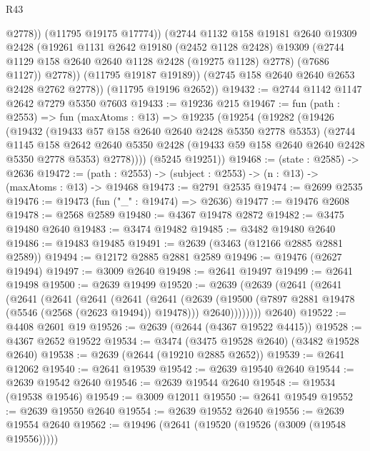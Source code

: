 \begin{lexlean}{R43}
\begin{coremodule}
                  @2778))
              (@11795 @19175 @17774))
            (@2744
              @1132
              @158
              @19181
              @2640
              @19309
              @2428
              (@19261
                @1131
                @2642
                @19180
                (@2452 @1128 @2428)
                @19309
                (@2744 @1129 @158 @2640 @2640 @1128 @2428 (@19275 @1128) @2778)
                (@7686 @1127))
              @2778))
          (@11795 @19187 @19189))
        (@2745 @158 @2640 @2640 @2653 @2428 @2762 @2778))
      (@11795 @19196 @2652))
@19432 := @2744 @1142 @1147 @2642 @7279 @5350 @7603
@19433 := @19236 @215
@19467 := fun (path : @2553) =>
  fun (maxAtoms : @13) =>
  @19235
    (@19254
      (@19282
        (@19426
          (@19432
            (@19433 @57 @158 @2640 @2640 @2428 @5350 @2778 @5353)
            (@2744
              @1145
              @158
              @2642
              @2640
              @5350
              @2428
              (@19433 @59 @158 @2640 @2640 @2428 @5350 @2778 @5353)
              @2778))))
      (@5245 @19251))
@19468 := (state : @2585) -> @2636
@19472 := (path : @2553) -> (subject : @2553) -> (n : @13) -> (maxAtoms : @13) -> @19468
@19473 := @2791 @2535
@19474 := @2699 @2535
@19476 := @19473 (fun ("_" : @19474) => @2636)
@19477 := @19476 @2608
@19478 := @2568 @2589
@19480 := @4367 @19478 @2872
@19482 := @3475 @19480 @2640
@19483 := @3474 @19482
@19485 := @3482 @19480 @2640
@19486 := @19483 @19485
@19491 := @2639 (@3463 (@12166 @2885 @2881 @2589))
@19494 := @12172 @2885 @2881 @2589
@19496 := @19476 (@2627 @19494)
@19497 := @3009 @2640
@19498 := @2641 @19497
@19499 := @2641 @19498
@19500 := @2639 @19499
@19520 := @2639
    (@2639
      (@2641
        (@2641
          (@2641
            (@2641
              (@2641
                (@2641
                  (@2641
                    (@2639
                      (@19500 (@7897 @2881 @19478 (@5546 (@2568 (@2623 @19494)) @19478)))
                      @2640))))))))
      @2640)
@19522 := @4408 @2601 @19
@19526 := @2639 (@2644 (@4367 @19522 @4415))
@19528 := @4367 @2652 @19522
@19534 := @3474 (@3475 @19528 @2640) (@3482 @19528 @2640)
@19538 := @2639 (@2644 (@19210 @2885 @2652))
@19539 := @2641 @12062
@19540 := @2641 @19539
@19542 := @2639 @19540 @2640
@19544 := @2639 @19542 @2640
@19546 := @2639 @19544 @2640
@19548 := @19534 (@19538 @19546)
@19549 := @3009 @12011
@19550 := @2641 @19549
@19552 := @2639 @19550 @2640
@19554 := @2639 @19552 @2640
@19556 := @2639 @19554 @2640
@19562 := @19496 (@2641 (@19520 (@19526 (@3009 (@19548 @19556)))))

\end{coremodule}
\end{lexlean}
